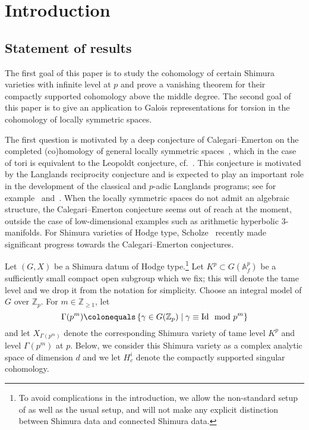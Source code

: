 \documentclass{amsart}
\theoremstyle{remark}
\numberwithin{equation}{subsection}
\newcommand{\A}{\AA}
\newcommand{\Z}{\ZZ}
\renewcommand{\AA}{{\mathbb A}}
\newcommand{\ZZ}{{\mathbb Z}}
\newcommand{\defeq}{\colonequals}
\renewcommand{\(}{\left(}
\renewcommand{\)}{\right)}
\begin{document}
\tableofcontents

\section{Introduction}

\subsection{Statement of results} The first goal of this paper is to study the cohomology of certain Shimura varieties with infinite level at $p$ and prove a vanishing theorem for their compactly supported cohomology above the middle degree. The second goal of this paper is to give an application to Galois representations for torsion in the cohomology of locally symmetric spaces. 

The first question is motivated by a deep conjecture of Calegari--Emerton on the completed (co)homology of general locally symmetric spaces~\cite[Conjecture 1.5]{calegari-emerton}, which in the case of tori is equivalent to the Leopoldt conjecture, cf.~\cite{hill}. This conjecture is motivated by the Langlands reciprocity conjecture and is expected to play an important role in the development of the classical and $p$-adic Langlands programs; see for example~\cite{emerton-icm} and~\cite{gee-newton}. When the locally symmetric spaces do not admit an algebraic structure, the Calegari--Emerton conjecture seems out of reach at the moment, outside the case of low-dimensional examples such as arithmetic hyperbolic $3$-manifolds. For Shimura varieties of Hodge type, Scholze~\cite{scholze-galois} recently made significant progress towards the Calegari--Emerton conjectures. 

Let $(G,X)$ be a Shimura datum of Hodge type.\footnote{To avoid complications in the introduction, we allow the non-standard setup of \cite[\S 4]{scholze-galois} as well as the usual setup, and will not make any explicit distinction between Shimura data and connected Shimura data.}
Let $K^p\subset G(\A^p_f)$ be a sufficiently small compact open subgroup which we fix; this will denote the tame level and we drop it from the notation for simplicity. Choose an integral model of $G$ over $\Z_p$. For $m\in \Z_{\geq 1}$, let 
\[
\Gamma(p^m)\defeq \left\{\gamma\in G(\Z_p)\mid \gamma\equiv \mathrm{Id}\mod{p^m}\right\}%
\]
and let $X_{\Gamma(p^m)}$ denote the corresponding Shimura variety of tame level $K^p$ and level $\Gamma(p^m)$ at $p$. Below, we consider this Shimura variety as a complex analytic space of dimension $d$ and we let $H^i_c$ denote the compactly supported singular cohomology. 
\end{document}
